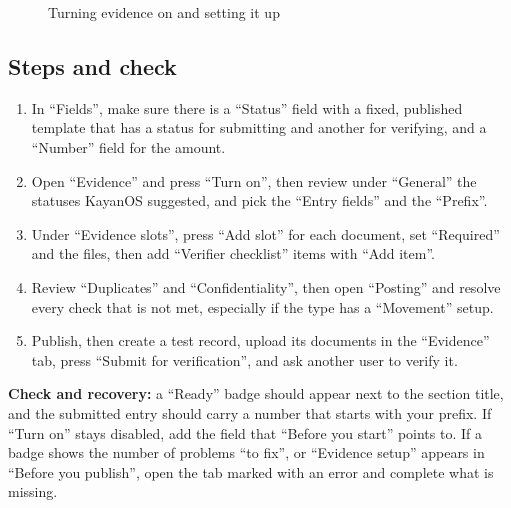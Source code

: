 \begin{figure}[H]
\centering
{}
\rclegend
\caption{Turning evidence on and setting it up}
\label{fig:builder-evidence-flow}
\end{figure}

\subsection{Steps and check}
\begin{enumerate}
\item In “Fields”, make sure there is a “Status” field with a fixed, published template that has a status for submitting and another for verifying, and a “Number” field for the amount.
\item Open “Evidence” and press “Turn on”, then review under “General” the statuses KayanOS suggested, and pick the “Entry fields” and the “Prefix”.
\item Under “Evidence slots”, press “Add slot” for each document, set “Required” and the files, then add “Verifier checklist” items with “Add item”.
\item Review “Duplicates” and “Confidentiality”, then open “Posting” and resolve every check that is not met, especially if the type has a “Movement” setup.
\item Publish, then create a test record, upload its documents in the “Evidence” tab, press “Submit for verification”, and ask another user to verify it.
\end{enumerate}

\textbf{Check and recovery:} a “Ready” badge should appear next to the section title, and the submitted entry should carry a number that starts with your prefix. If “Turn on” stays disabled, add the field that “Before you start” points to. If a badge shows the number of problems “to fix”, or “Evidence setup” appears in “Before you publish”, open the tab marked with an error and complete what is missing.

